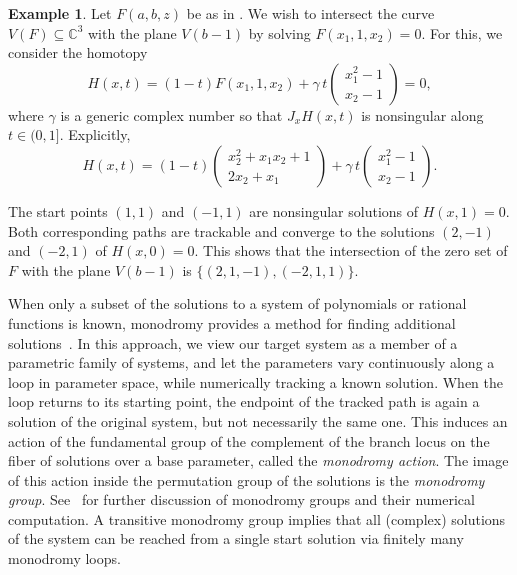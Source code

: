 \documentclass[11pt]{article}
\numberwithin{equation}{section}
\theoremstyle{plain}
\theoremstyle{definition}
\newtheorem{example}[theorem]{Example}
\theoremstyle{remark}
\newcommand\bC{{\mathbb C}}
\begin{document}
\begin{example}\label{Ex: quadratic discriminant5}
    Let $F(a,b,z)$ be as in . We wish to intersect the curve $V(F)\subseteq\bC^3$ with the plane $V(b-1)$ by solving $F(x_1,1,x_2)=0$. For this, we consider the homotopy
    \begin{equation*}
        H(x,t) = (1-t)F(x_{1},1,x_{2}) + \gamma \,t\begin{pmatrix}x_{1}^{2} - 1 \\[2pt] x_{2} - 1\end{pmatrix}= 0,
    \end{equation*}
    where $\gamma$ is a generic complex number so that  $J_{x}H(x,t)$ is nonsingular along $t\in(0,1]$. Explicitly,
    \begin{equation*}
        H(x,t) = (1-t) \begin{pmatrix}x_{2}^{2} + x_{1}x_{2} + 1 \\[2pt] 2x_{2} + x_{1}\end{pmatrix} + \gamma\, t\begin{pmatrix}x_{1}^{2} - 1 \\[2pt] x_{2} - 1\end{pmatrix}.
    \end{equation*}

    The start points $(1,1)$ and $(-1,1)$ are nonsingular solutions of $H(x,1)=0$. Both corresponding paths are trackable and converge to the solutions $(2,-1)$ and $(-2,1)$ of $H(x,0)=0$. This shows that the intersection of the zero set of $F$ with the plane $V(b-1)$ is $\{(2,1,-1), (-2,1,1)\}$.
\end{example}
When only a subset of the solutions to a system of polynomials or rational functions is known, monodromy provides a method for finding additional solutions~\cite{TensorDecomp,MonodromyDecomp,Duff2018monodromy,MonodromySolver,MonodromyStats}. In this approach, we view our target system as a member of a parametric family of systems, and let the parameters vary continuously along a loop in parameter space, while numerically tracking a known solution. When the loop returns to its starting point, the endpoint of the tracked path is again a solution of the original system, but not necessarily the same one. This induces an action of the fundamental group of the complement of the branch locus on the fiber of solutions over a base parameter, called the {\em monodromy action}. The image of this action inside the permutation group of the solutions is the {\em monodromy group}. See~\cite{GaloisMonodromy} for further discussion of monodromy groups and their numerical computation. A transitive monodromy group implies that all (complex) solutions of the system can be reached from a single start solution via finitely many monodromy loops.
\end{document}
